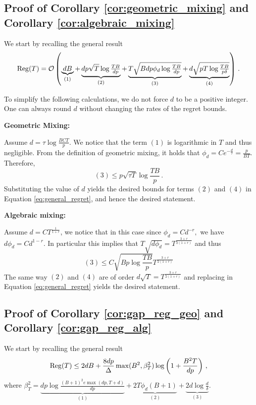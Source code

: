 \subsection{Proof of Corollary \ref{cor:geometric_mixing} and Corollary \ref{cor:algebraic_mixing}}
We start by recalling the general result
\begin{equation}
\label{eq:general_regret}
\mathrm{Reg}(T)  = \mathcal{O}\left(\underbrace{dB}_{(1)} + \underbrace{dp\sqrt{T}\log\tfrac{TB}{dp}}_{(2)} + \underbrace{T\sqrt{Bdp\phi_d\log\tfrac{TB}{dp}}}_{(3)} + \underbrace{d\sqrt{pT\log\tfrac{TB}{p\delta}}}_{(4)}\right)\,.
\end{equation}

To simplify the following calculations, we do not force $d$ to be a positive integer. One can always round $d$ without changing the rates of the regret bounds.

\textbf{Geometric Mixing:}

Assume $d= \tau \log \frac{BCT}{p}$. We notice that the term $(1)$ is logarithmic in $T$ and thus negligible. From the definition of geometric mixing, it holds that $\phi_d = Ce^{-\frac{d}{\tau}}=\frac{p}{BT}.$ Therefore, \[(3) \leq p\sqrt{\tau  T}\log\frac{TB}{p}\,.\] Substituting the value of $d$ yields the desired bounds for terms $(2)$ and $(4)$ in Equation \ref{eq:general_regret}, and hence the desired statement.

\textbf{Algebraic mixing:}

Assume $d =  CT^{\frac{1}{1+r}}$, we notice that in this case since $\phi_d = Cd^{-r},$ we have $d\phi_d = Cd^{1-r}$. In particular this implies that $T\sqrt{d\phi_d} = T^{\frac{3+r}{2(1+r)}}$ and thus
\[(3)\leq C\sqrt{Bp\log\frac{TB}{p}}T^{\frac{3+r}{2(1+r)}}\]
The same way $(2)$ and $(4)$ are of order $d\sqrt{T}= T^{\frac{3+r}{2(1+r)}}$ and replacing in Equation \ref{eq:general_regret} yields the desired statement.




\subsection{Proof of Corollary \ref{cor:gap_reg_geo} and Corollary \ref{cor:gap_reg_alg}}
\label{proof:cor2}
We start by recalling the general result
\begin{align*}
\mathrm{Reg}(T) \leq 2dB + \frac{8dp}{\Delta}\max(B^2, \beta_{T}^2)\log\left(1 + \frac{B^2T}{dp}\right)\,,
\end{align*}
where $\beta_T^2 = \underbrace{dp\log\tfrac{(B+1)^2e\max(dp,T+d)}{dp}}_{(1)} + \underbrace{2T\phi_d (B+1)}_{(2)} + \underbrace{2d\log\tfrac{d}{\delta}}_{(3)}$.


